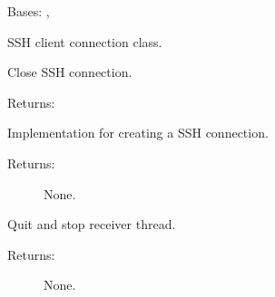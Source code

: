 \documentclass[letterpaper,10pt,english]{sphinxmanual}
\begin{document}
\begin{fulllineitems}
\label{\detokenize{QConnectBase:QConnectBase.tcp.ssh.ssh_client.SSHClient}}
\sphinxAtStartPar
Bases: {\hyperref[\detokenize{QConnectBase:QConnectBase.tcp.tcp_base.TCPBase}]{}}, {\hyperref[\detokenize{QConnectBase:QConnectBase.tcp.tcp_base.TCPBaseClient}]{}}

\sphinxAtStartPar
SSH client connection class.

\begin{fulllineitems}
\label{\detokenize{QConnectBase:QConnectBase.tcp.ssh.ssh_client.SSHClient.close}}
\sphinxAtStartPar
Close SSH connection.

\sphinxAtStartPar
Returns:

\end{fulllineitems}


\begin{fulllineitems}
\label{\detokenize{QConnectBase:QConnectBase.tcp.ssh.ssh_client.SSHClient.connect}}
\sphinxAtStartPar
Implementation for creating a SSH connection.
\begin{description}
\item[{Returns:}] \leavevmode
\sphinxAtStartPar
None.

\end{description}

\end{fulllineitems}


\begin{fulllineitems}
\label{\detokenize{QConnectBase:QConnectBase.tcp.ssh.ssh_client.SSHClient.quit}}
\sphinxAtStartPar
Quit and stop receiver thread.
\begin{description}
\item[{Returns:}] \leavevmode
\sphinxAtStartPar
None.

\end{description}

\end{fulllineitems}


\end{fulllineitems}
\end{document}
